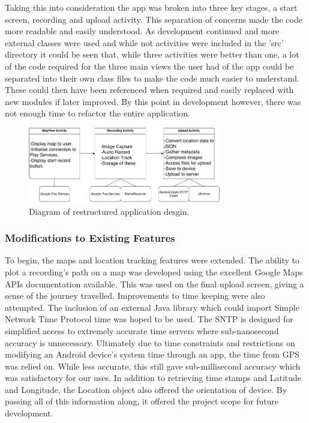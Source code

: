 \documentclass{l3proj}
\begin{document}
Taking this into consideration the app was broken into three key stages, a start screen, recording and upload activity. This separation of concerns made the code more readable and easily understood. As development continued and more external classes were used and while not activities were included in the 'src' directory it could be seen that, while three activities were better than one, a lot of the code required for the three main views the user had of the app could be separated into their own class files to make the code much easier to understand. These could then have been referenced when required and easily replaced with new modules if later improved. By this point in development however, there was not enough time to refactor the entire application.

\begin{figure}[ht!]
\centering
\includegraphics[width=0.75\textwidth]{images/android-app-structure.png}
\caption{Diagram of restructured application desgin.}
\end{figure}

\subsubsection{Modifications to Existing Features}
To begin, the maps and location tracking features were extended. The ability to plot a recording's path on a map was developed using the excellent Google Maps APIs documentation available. This was used on the final upload screen, giving a sense of the journey travelled. Improvements to time keeping were also attempted. The inclusion of an external Java library\cite{sntp} which could import Simple Network Time Protocol time was hoped to be used. The SNTP is designed for simplified access to extremely accurate time servers where sub-nanosecond accuracy is unnecessary. Ultimately due to time constraints and restrictions on modifying an Android device's system time through an app, the time from GPS was relied on. While less accurate, this still gave sub-millisecond accuracy which was satisfactory for our uses. In addition to retrieving time stamps and Latitude and Longitude, the Location object also offered the orientation of device. By passing all of this information along, it offered the project scope for future development.
\end{document}
